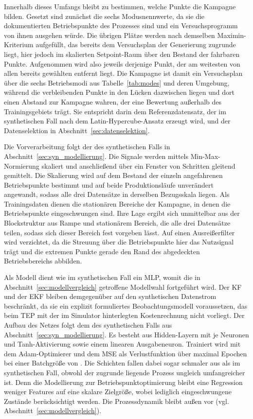 %
Innerhalb dieses Umfangs bleibt zu bestimmen, welche Punkte die Kampagne bilden. Gesetzt sind zunächst die sechs Modusnennwerte, da sie die dokumentierten Betriebspunkte des Prozesses sind und ein Versuchsprogramm von ihnen ausgehen würde. Die übrigen Plätze werden nach demselben Maximin-Kriterium aufgefüllt, das bereits dem Versuchsplan der Generierung zugrunde liegt, hier jedoch im skalierten Setpoint-Raum über den Bestand der fahrbaren Punkte. Aufgenommen wird also jeweils derjenige Punkt, der am weitesten von allen bereits gewählten entfernt liegt. Die Kampagne ist damit ein Versuchsplan über die sechs Betriebsmodi aus Tabelle~\ref{tab:modes} und deren Umgebung, während die verbleibenden Punkte in den Lücken dazwischen liegen und dort einen Abstand zur Kampagne wahren, der eine Bewertung außerhalb des Trainingsgebiets trägt. Sie entspricht darin dem Referenzdatensatz, der im synthetischen Fall nach dem Latin-Hypercube-Ansatz erzeugt wird, und der Datenselektion in Abschnitt~\ref{sec:datenselektion}. \par
%
Die Vorverarbeitung folgt der des synthetischen Falls in Abschnitt~\ref{sec:syn_modellierung}. Die Signale werden mittels Min-Max-Normierung skaliert und anschließend über ein Fenster von \tepParamWindow{} Schritten gleitend gemittelt. Die Skalierung wird auf dem Bestand der einzeln angefahrenen Betriebspunkte bestimmt und auf beide Produktionsläufe unverändert angewandt, sodass alle drei Datensätze in derselben Bezugsskala liegen. Als Trainingsdaten dienen die stationären Bereiche der Kampagne, in denen die Betriebspunkte eingeschwungen sind. Ihre Lage ergibt sich unmittelbar aus der Blockstruktur aus Rampe und stationärem Bereich, die alle drei Datensätze teilen, sodass sich dieser Bereich fest vorgeben lässt. Auf einen Ausreißerfilter wird verzichtet, da die Streuung über die Betriebspunkte hier das Nutzsignal trägt und die extremen Punkte gerade den Rand des abgedeckten Betriebsbereichs abbilden. \par
%
Als Modell dient wie im synthetischen Fall ein \ac{MLP}, womit die in Abschnitt~\ref{sec:modellvergleich} getroffene Modellwahl fortgeführt wird. Der \ac{KF} und der \ac{EKF} bleiben demgegenüber auf den synthetischen Datenstrom beschränkt, da sie ein explizit formuliertes Beobachtungsmodell voraussetzen, das beim \ac{TEP} mit der im Simulator hinterlegten Kostenrechnung nicht vorliegt.
%
Der Aufbau des Netzes folgt dem des synthetischen Falls aus Abschnitt~\ref{sec:syn_modellierung}. Es besteht aus \tepParamNLayers{} Hidden-Layern mit je \tepParamNeurons{} Neuronen und Tanh-Aktivierung sowie einem linearen Ausgabeneuron. Trainiert wird mit dem Adam-Optimierer und dem \ac{MSE} als Verlustfunktion über maximal \tepParamEpochs{} Epochen bei einer Batchgröße von \tepParamBatch{}. Die Schichten fallen dabei sogar schmaler aus als im synthetischen Fall, obwohl der zugrunde liegende Prozess ungleich umfangreicher ist. Denn die Modellierung zur Betriebspunktoptimierung bleibt eine Regression weniger Features auf eine skalare Zielgröße, wobei lediglich eingeschwungene Zustände berücksichtigt werden. Die Prozessdynamik bleibt außen vor (vgl. Abschnitt~\ref{sec:modellvergleich}). \par
